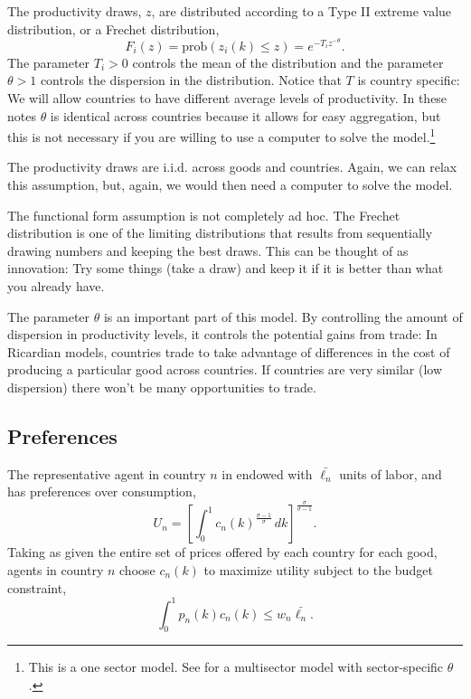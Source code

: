 \documentclass[11pt, pdftex]{article}
\begin{document}
The productivity draws, $z$, are distributed according to a Type II extreme value distribution, or a Frechet  distribution,
\begin{equation}\label{eq:frechet}
    F_i(z) = \mathrm{prob}\left(z_i\left(k \right) \leq z \right)=e^{-T_i z^{-\theta}}.
\end{equation}
The parameter $T_i>0$ controls the mean of the distribution and the parameter $\theta>1$ controls the dispersion in the distribution.  Notice that $T$ is country specific: We will allow countries to have different average levels of productivity.  In these notes $\theta$ is identical across countries because it allows for easy aggregation, but this is not necessary if you are willing to use a computer to solve the model.\footnote{This is a one sector model.  See \citet{caliendoParro} for a multisector model with sector-specific $\theta$.}

The productivity draws are i.i.d. across goods and countries. Again, we can relax this assumption, but, again, we would then need a computer to solve the model.

The functional form assumption is not completely ad hoc.  The Frechet distribution is one of the limiting distributions that results from sequentially drawing numbers and keeping the best draws.  This can be thought of as innovation: Try some things (take a draw) and keep it if it is better than what you already have.

The parameter $\theta$ is an important part of this model. By controlling the amount of dispersion in productivity levels, it controls the potential gains from trade: In Ricardian models, countries trade to take advantage of differences in the cost of producing a particular good across countries.  If countries are very similar (low dispersion) there won't be many opportunities to trade.
\subsection*{Preferences}
The representative agent in country $n$ in endowed with $\bar{\ell_n}$ units of labor, and has preferences over consumption,
\begin{equation}\label{eq:pref}
    U_n=\left[ \int_0^1  \! \! c_n(k) ^{\frac{\sigma-1}{\sigma}} \, dk\right]^{\frac{\sigma}{\sigma-1}}.
\end{equation}
Taking as given the entire set of prices offered by each country for each good, agents in country $n$ choose $c_n(k)$ to maximize utility subject to the budget constraint,
\begin{equation}
    \int_0^1 p_n(k)c_n(k) \leq w_n\bar{\ell_n}.
\end{equation}
\end{document}
